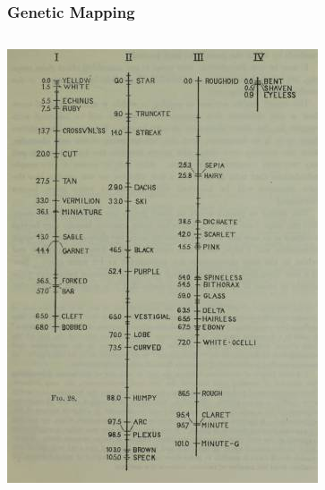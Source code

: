 \documentclass{beamer}
\begin{document}




\begin{frame}
	\frametitle{Genetic Mapping}
	\begin{columns}
		\begin{column}{0.4\textwidth}
			\centering	\includegraphics[keepaspectratio, width  =\textwidth]{img/MorganMap} 
		\end{column}
		\begin{column}{0.6\textwidth}
			

\end{column}
\end{columns}
\end{frame}
\end{document}
